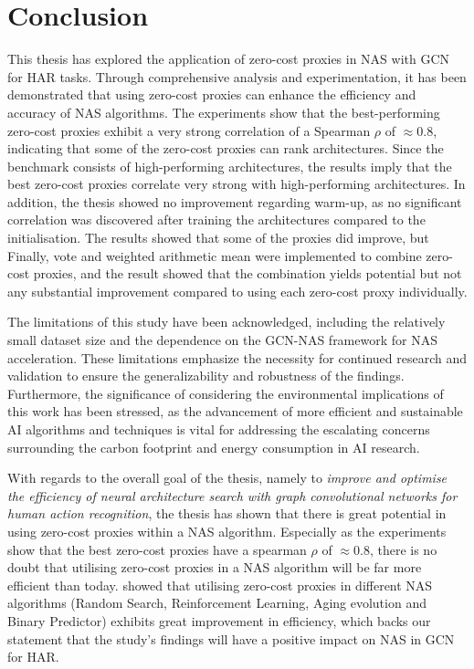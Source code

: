 \section{Conclusion}

This thesis has explored the application of zero-cost proxies in NAS with GCN for HAR tasks. Through comprehensive analysis and experimentation, it has been demonstrated that using zero-cost proxies can enhance the efficiency and accuracy of NAS algorithms. The experiments show that the best-performing zero-cost proxies exhibit a very strong correlation of a Spearman $\rho$ of $\approx 0.8$, indicating that some of the zero-cost proxies can rank architectures. Since the benchmark consists of high-performing architectures, the results imply that the best zero-cost proxies correlate very strong with high-performing architectures. In addition, the thesis showed no improvement regarding warm-up, as no significant correlation was discovered after training the architectures compared to the initialisation. The results showed that some of the proxies did improve, but  Finally, vote and weighted arithmetic mean were implemented to combine zero-cost proxies, and the result showed that the combination yields potential but not any substantial improvement compared to using each zero-cost proxy individually. 
 

The limitations of this study have been acknowledged, including the relatively small dataset size and the dependence on the GCN-NAS framework for NAS acceleration. These limitations emphasize the necessity for continued research and validation to ensure the generalizability and robustness of the findings. Furthermore, the significance of considering the environmental implications of this work has been stressed, as the advancement of more efficient and sustainable AI algorithms and techniques is vital for addressing the escalating concerns surrounding the carbon footprint and energy consumption in AI research.

With regards to the overall goal of the thesis, namely to \textit{improve and optimise the efficiency of neural architecture search with
graph convolutional networks for human action recognition}, the thesis has shown that there is great potential in using zero-cost proxies within a NAS algorithm. Especially as the experiments show that the best zero-cost proxies have a spearman $\rho$ of $\approx 0.8$, there is no doubt that utilising zero-cost proxies in a NAS algorithm will be far more efficient than today. \cite{abdelfattah2021zero} showed that utilising zero-cost proxies in different NAS algorithms (Random Search, Reinforcement Learning, Aging evolution and Binary Predictor) exhibits great improvement in efficiency, which backs our statement that the study's findings will have a positive impact on NAS in GCN for HAR.